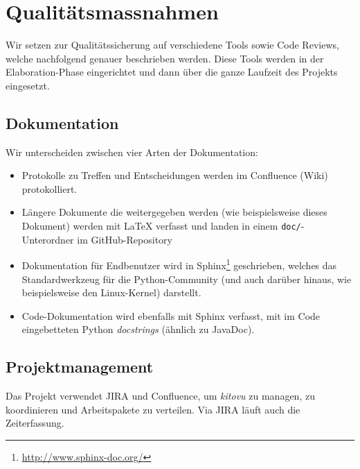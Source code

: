 \documentclass[a4paper]{article}
\let\oldsection\section
\renewcommand\section{\clearpage\oldsection}
\begin{document}
\section{Qualitätsmassnahmen}
%

Wir setzen zur Qualitätssicherung auf verschiedene Tools sowie Code Reviews,
welche nachfolgend genauer beschrieben werden. Diese Tools werden in der
Elaboration-Phase eingerichtet und dann über die ganze Laufzeit des Projekts
eingesetzt.

\subsection{Dokumentation}

Wir unterscheiden zwischen vier Arten der Dokumentation:

\begin{itemize}
  \item Protokolle zu Treffen und Entscheidungen werden im Confluence (Wiki) protokolliert.
  \item Längere Dokumente die weitergegeben werden (wie beispielsweise dieses
    Dokument) werden mit \LaTeX{} verfasst und landen in einem
    \texttt{doc/}-Unterordner im GitHub-Repository
  \item Dokumentation für Endbenutzer wird in
    Sphinx\footnote{\url{http://www.sphinx-doc.org/}} geschrieben, welches das
    Standardwerkzeug für die Python-Community (und auch darüber hinaus, wie
    beispielsweise den Linux-Kernel) darstellt.
  \item Code-Dokumentation wird ebenfalls mit Sphinx verfasst, mit im Code
    eingebetteten Python \emph{docstrings} (ähnlich zu JavaDoc).
\end{itemize}

\subsection{Projektmanagement}
Das Projekt verwendet JIRA und Confluence, um \emph{kitovu} zu managen, zu koordinieren und Arbeitspakete zu verteilen. Via JIRA läuft auch die Zeiterfassung.
\end{document}
